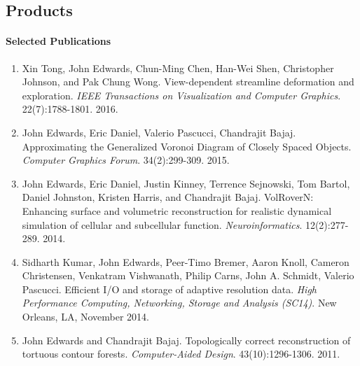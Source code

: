 \documentclass[svgnames,12pt]{article}
\newenvironment{tightenumerate}{
\begin{enumerate}
  \setlength{\itemsep}{1pt}
  \setlength{\parskip}{0pt}
  \setlength{\parsep}{0pt}
}{\end{enumerate}
}
\begin{document}
\subsection*{Products}
\paragraph{Selected Publications}
\begin{tightenumerate}
\item Xin Tong, John Edwards, Chun-Ming Chen, Han-Wei Shen, Christopher Johnson, and Pak Chung Wong. View-dependent streamline deformation and exploration. \textit{IEEE Transactions on Visualization and Computer Graphics}. 22(7):1788-1801. 2016.
\item John Edwards, Eric Daniel, Valerio Pascucci, Chandrajit Bajaj. Approximating the Generalized Voronoi Diagram of Closely Spaced Objects. \textit{Computer Graphics Forum}. 34(2):299-309. 2015.
\item John Edwards, Eric Daniel, Justin Kinney, Terrence Sejnowski, Tom Bartol, Daniel Johnston, Kristen Harris, and Chandrajit Bajaj. VolRoverN: Enhancing surface and volumetric reconstruction for realistic dynamical simulation of cellular and subcellular function.  \textit{Neuroinformatics}. 12(2):277-289.  2014.
\item Sidharth Kumar, John Edwards, Peer-Timo Bremer, Aaron Knoll, Cameron Christensen, Venkatram Vishwanath, Philip Carns, John A. Schmidt, Valerio Pascucci. Efficient I/O and storage of adaptive resolution data. \textit{High Performance Computing, Networking, Storage and Analysis (SC14)}. New Orleans, LA, November 2014.
\item John Edwards and Chandrajit Bajaj. Topologically correct reconstruction of tortuous contour forests. \textit{Computer-Aided Design}. 43(10):1296-1306. 2011.
\end{tightenumerate}

\newpage
\end{document}
